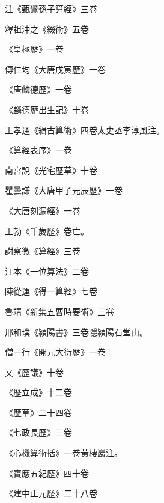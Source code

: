 \begin{pinyinscope}
 注《甄鸞孫子算經》三卷



 釋祖沖之《綴術》五卷



 《皇極歷》一卷



 傅仁均《大唐戊寅歷》一卷



 《唐麟德歷》一卷



 《麟德歷出生記》十卷



 王孝通《緝古算術》四卷太史丞李淳風注。



 《算經表序》一卷



 南宮說《光宅歷草》十卷



 瞿曇謙《大唐甲子元辰歷》一卷



 《大唐刻漏經》一卷



 王勃《千歲歷》卷亡。



 謝察微《算經》三卷



 江本《一位算法》二卷



 陳從運《得一算經》七卷



 魯靖《新集五曹時要術》三卷



 邢和璞《潁陽書》三卷隱潁陽石堂山。



 僧一行《開元大衍歷》一卷



 又《歷議》十卷



 《歷立成》十二卷



 《歷草》二十四卷



 《七政長歷》三卷



 《心機算術括》一卷黃棲巖注。



 《寶應五紀歷》四十卷



 《建中正元歷》二十八卷




\end{pinyinscope}
